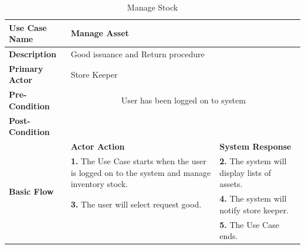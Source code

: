 \begin{table}[!h]
\begin{tabular}{|l|p{6cm}|p{6cm}|}
\hline 
\rule[-1ex]{0pt}{2.5ex} \textbf{Use Case Name} & \multicolumn{2}{p{10cm}|}{Manage Asset} \\ 
\hline 
\rule[-1ex]{0pt}{2.5ex} \textbf{Description} &\multicolumn{2}{p{10cm}|}{Good issuance
and Return procedure} \\ 
\hline 
\rule[-1ex]{0pt}{2.5ex} \textbf{Primary Actor}& \multicolumn{2}{p{10cm}|}{Store Keeper} \\ 
\hline 
\rule[-1ex]{0pt}{2.5ex} \textbf{Pre-Condition} & \multicolumn{2}{c|}{User has been logged on to system} \\ 
\hline 
\rule[-1ex]{0pt}{2.5ex} \textbf{Post-Condition} & \multicolumn{2}{p{10cm}|}{}  \\ 
\hline 
\multirow{4}{*}{\textbf{Basic Flow}} & \textbf{Actor Action} & \textbf{System Response}\\
\cline{2-3}
%
&
\textbf{1.}  The Use Case starts when the user is logged on to the system and manage inventory stock.
& 
\textbf{2.}  The system will display lists of assets.
\\
%
&
\textbf{3.}  The user will select request good.
& 
\textbf{4.}  The system will notify store keeper. 
\\
%
&

& 
\textbf{5.}  The Use Case ends. 
\\
\hline
\end{tabular}
\caption{Manage Stock} 
\end{table}



